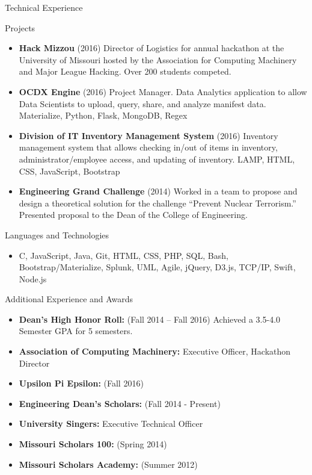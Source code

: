 \documentclass[]{mcdowellcv}
\begin{document}
	\begin{cvsection}{Technical Experience}
		\begin{cvsubsection}{Projects}{}{}
			\begin{itemize}
				\item \textbf{Hack Mizzou} (2016) Director of Logistics for annual hackathon at the University of Missouri hosted by the Association for Computing Machinery and Major League Hacking. Over 200 students competed.
				\item \textbf{OCDX Engine} (2016) Project Manager. Data Analytics application to allow Data Scientists to upload, query, share, and analyze manifest data. Materialize, Python, Flask, MongoDB, Regex
				\item \textbf{Division of IT Inventory Management System} (2016) Inventory management system that allows checking in/out of items in inventory, administrator/employee access, and updating of inventory. LAMP, HTML, CSS, JavaScript, Bootstrap
				\item \textbf{Engineering Grand Challenge} (2014) Worked in a team to propose and design a theoretical solution for the challenge “Prevent Nuclear Terrorism.” Presented proposal to the Dean of the College of Engineering.
			\end{itemize}
		\end{cvsubsection}
      \begin{cvsubsection}{Languages and Technologies}{}{}
      \begin{itemize}
				\item C, JavaScript, Java, Git, HTML, CSS, PHP, SQL,  Bash, Bootstrap/Materialize, Splunk, UML, Agile, jQuery, D3.js, TCP/IP, Swift, Node.js
			\end{itemize}
        \end{cvsubsection}
	\end{cvsection}
	
	\begin{cvsection}{Additional Experience and Awards}
		\begin{cvsubsection}{}{}{}	
			\begin{itemize}
				\item \textbf{Dean’s High Honor Roll:}  (Fall 2014 – Fall 2016) Achieved a 3.5-4.0 Semester GPA for 5 semesters.
                \item \textbf{Association of Computing Machinery:} Executive Officer, Hackathon Director
		\item \textbf{Upsilon Pi Epsilon:}  (Fall 2016)
                \item \textbf{Engineering Dean’s Scholars:} (Fall 2014 - Present)
                \item \textbf{University Singers:} Executive Technical Officer
                \item \textbf{Missouri Scholars 100:} (Spring 2014)
                \item \textbf{Missouri Scholars Academy:} (Summer 2012)
			\end{itemize}
		\end{cvsubsection}
	\end{cvsection}
\end{document}
